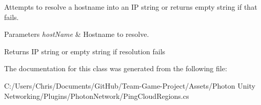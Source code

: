Attempts to resolve a hostname into an IP string or returns empty string if that fails. 


\begin{DoxyParams}{Parameters}
{\em host\+Name} & Hostname to resolve.\\
\hline
\end{DoxyParams}
\begin{DoxyReturn}{Returns}
IP string or empty string if resolution fails
\end{DoxyReturn}


The documentation for this class was generated from the following file\+:\begin{DoxyCompactItemize}
\item 
C\+:/\+Users/\+Chris/\+Documents/\+Git\+Hub/\+Team-\/\+Game-\/\+Project/\+Assets/\+Photon Unity Networking/\+Plugins/\+Photon\+Network/Ping\+Cloud\+Regions.\+cs\end{DoxyCompactItemize}
